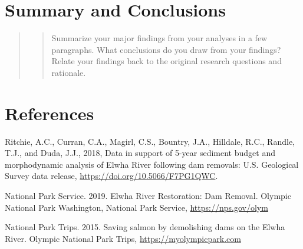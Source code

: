 \documentclass[12pt,]{article}
\begin{document}
\newpage

\hypertarget{summary-and-conclusions}{%
\section{Summary and Conclusions}\label{summary-and-conclusions}}

\begin{quote}
\begin{quote}
Summarize your major findings from your analyses in a few paragraphs.
What conclusions do you draw from your findings? Relate your findings
back to the original research questions and rationale.
\end{quote}
\end{quote}

\newpage

\hypertarget{references}{%
\section{References}\label{references}}

Ritchie, A.C., Curran, C.A., Magirl, C.S., Bountry, J.A., Hilldale,
R.C., Randle, T.J., and Duda, J.J., 2018, Data in support of 5-year
sediment budget and morphodynamic analysis of Elwha River following dam
removals: U.S. Geological Survey data release,
\url{https://doi.org/10.5066/F7PG1QWC}.

National Park Service. 2019. Elwha River Restoration: Dam Removal.
Olympic National Park Washington, National Park Service,
\url{https://nps.gov/olym}

National Park Trips. 2015. Saving salmon by demolishing dams on the
Elwha River. Olympic National Park Trips,
\url{https://myolympicpark.com}
\end{document}
